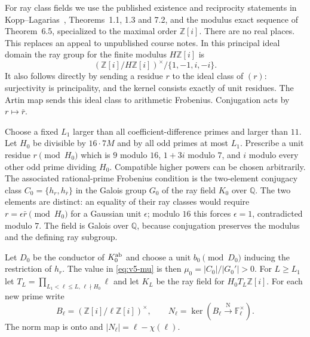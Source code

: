 \documentclass[11pt]{article}
\theoremstyle{definition}
\theoremstyle{remark}
\begin{document}
For ray class fields we use the published existence and reciprocity
statements in Kopp--Lagarias~\cite{v5kl}, Theorems~1.1, 1.3 and 7.2,
and the modulus exact sequence of Theorem~6.5, specialized to the maximal
order $\mathbb Z[i]$. There are no real places. This replaces an appeal
to unpublished course notes. In this principal ideal domain the ray group
for the finite modulus $H\mathbb Z[i]$ is
\begin{equation}\label{eq:v5-ray-group}
 (\mathbb Z[i]/H\mathbb Z[i])^\times/\{1,-1,i,-i\}.
\end{equation}
It also follows directly by sending a residue $r$ to the ideal class of
$(r)$: surjectivity is principality, and the kernel consists exactly of
unit residues. The Artin map sends this ideal class to arithmetic
Frobenius. Conjugation acts by $r\mapsto\bar r$.

Choose a fixed $L_1$ larger than all coefficient-difference primes and
larger than $11$. Let $H_0$ be divisible by $16\cdot7M$ and by all odd
primes at most $L_1$. Prescribe a unit residue $r\pmod{H_0}$ which is
$9$ modulo $16$, $1+3i$ modulo $7$, and $i$ modulo every other odd
prime dividing $H_0$. Compatible higher powers can be chosen arbitrarily.
The associated rational-prime Frobenius condition is the two-element
conjugacy class $C_0=\{h_r,h_{\bar r}\}$ in the Galois group $G_0$ of
the ray field $K_0$ over $\mathbb Q$.
The two elements are distinct: an equality of their ray classes would
require $r=\epsilon\bar r\pmod{H_0}$ for a Gaussian unit $\epsilon$;
modulo $16$ this forces $\epsilon=1$, contradicted modulo $7$.
The field is Galois over $\mathbb Q$, because conjugation preserves the
modulus and the defining ray subgroup.

Let $D_0$ be the conductor of $K_0^{\rm ab}$ and choose a unit
$b_0\pmod{D_0}$ inducing the restriction of $h_r$.
The value in \eqref{eq:v5-mu} is then
$\mu_0=|C_0|/|G_0'|>0$.
For $L\geq L_1$ let
$T_L=\prod_{L_1<\ell\leq L,\,\ell\nmid H_0}\ell$ and let $K_L$ be the
ray field for $H_0T_L\mathbb Z[i]$. For each new prime write
\[
 B_\ell=(\mathbb Z[i]/\ell\mathbb Z[i])^\times,
 \qquad N_\ell=\ker(B_\ell\xrightarrow{\mathrm N}\mathbb F_\ell^\times).
\]
The norm map is onto and $|N_\ell|=\ell-\chi(\ell)$.
\end{document}
